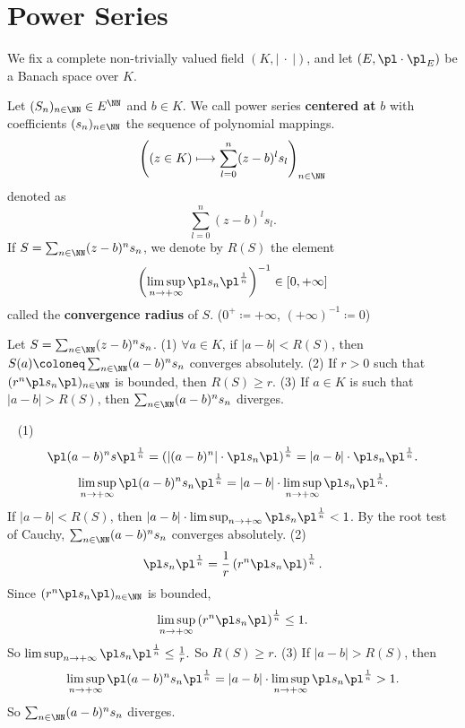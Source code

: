 \section{Power Series}
We fix a complete non-trivially valued field $(K,\left| \ \cdot\ \right|)$, and let $(E,\pl\cdot\pl_E)$ be a Banach space over $K$. 
\begin{definitionenv}
    Let $(S_n)_{n\in\NN}\in E^\NN$ and $b\in K$. We call power series \textbf{centered at} $b$ with  coefficients $(s_n)_{n\in\NN}$ the sequence of polynomial mappings.
    $$ \left((z\in K)\longmapsto \sum_{l=0}^{n}(z-b)^l s_l\right)_{n\in\NN}$$
    denoted as 
    $$\sum_{l=0}^{n}(z-b)^l s_l.$$
    If  $S=\sum_{n\in\NN}(z-b)^ns_n$, we denote by $R(S)$ the element 
    $$ \left(\limsup_{n\rightarrow +\infty}\pl s_n\pl ^{\frac{1}{n}}\right)^{-1}\in [0,+\infty]$$
    called the \textbf{convergence radius} of $S$. ($0^+\coloneq+\infty$, $(+\infty)^{-1}\coloneq 0$)
\end{definitionenv}
\begin{propositionenv}
    Let $ S=\sum_{n\in\NN}(z-b)^ns_n$. 
    \newline
    (1) $\forall a\in K$, if $|a-b|<R(S)$, then $S(a)\coloneq \sum_{n\in\NN}(a-b)^n s_n$ converges absolutely.
    \newline
    (2) If $r>0$ such that $(r^n\pl s_n\pl)_{n\in\NN}$ is bounded, then $R(S)\ge r$.
    \newline
    (3) If $a\in K$ is such that $|a-b|> R(S)$, then $ \sum_{n\in \NN}(a-b)^n s_n$ diverges.
\end{propositionenv}
\begin{proofenv}
    \ \newline
    (1) 
    $$ \pl (a-b)^n s\pl ^\frac{1}{n}=\left(|(a-b)^n|\cdot\pl s_n\pl\right)^{\frac{1}{n}}=|a-b|\cdot\pl s_n\pl^{\frac{1}{n}}.$$
    $$ \limsup_{n\rightarrow +\infty}\pl (a-b)^ns_n\pl^{\frac{1}{n}}= |a-b|\cdot\limsup_{n\rightarrow +\infty}\pl s_n\pl^{\frac{1}{n}}.$$
    If $|a-b|<R(S)$, then $|a-b|\cdot\limsup_{n\rightarrow +\infty}\pl s_n\pl^{\frac{1}{n}}<1$. By the root test of Cauchy, $\sum_{n\in \NN}(a-b)^ns_n$ converges absolutely. 
    \newline
    (2) $$ \pl s_n\pl^{\frac{1}{n}}=\frac{1}{r}\left(r^n\pl s_n\pl\right)^{\frac{1}{n}}.$$
    Since $(r^n\pl s_n\pl)_{n\in\NN}$ is bounded, 
    $$ \limsup_{n\rightarrow +\infty}\left(r^n \pl s_n\pl\right)^{\frac{1}{n}}\le 1.$$
    So $\limsup_{n\rightarrow +\infty}\pl s_n\pl^{\frac{1}{n}}\le \frac{1}{r}.$ So $R(S)\ge r$.
    \newline
    (3) If $|a-b|>R(S)$, then 
    $$\limsup_{n\rightarrow+\infty}\pl (a-b)^ns_n\pl^{\frac{1}{n}}=|a-b|\cdot\limsup_{n\rightarrow+\infty}\pl s_n\pl^{\frac{1}{n}}>1.$$
    So $\sum_{n\in\NN}(a-b)^ns_n$ diverges.
\end{proofenv}
